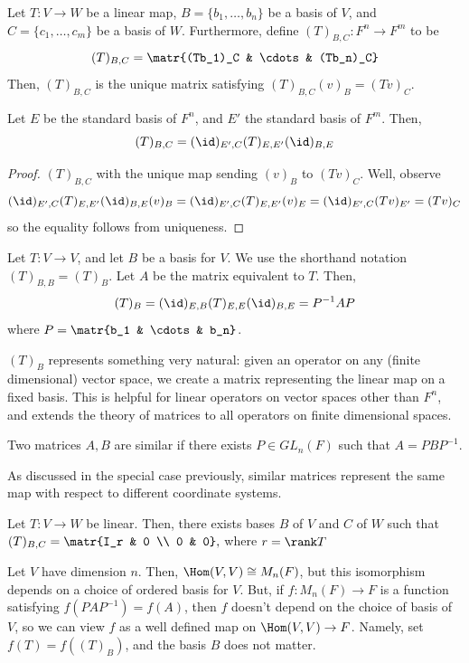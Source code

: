 \begin{defn}
    Let $T:V \to W$ be a linear map, $B=\{b_1,\dots,b_n\}$ be a basis of $V$, and $C=\{c_1,\dots,c_m\}$ be a basis of $W$. Furthermore, define $(T)_{B,C}:F^n\to F^m$  to be
    $$(T)_{B,C}=\matr{(Tb_1)_C & \cdots & (Tb_n)_C}$$
    Then, $(T)_{B,C}$ is the unique matrix satisfying $(T)_{B,C}(v)_B=(Tv)_C$.
\end{defn}

\begin{thm}
    Let $E$ be the standard basis of $F^n$, and $E'$ the standard basis of $F^m$. Then,
    $$(T)_{B,C}=(\id)_{E',C}(T)_{E,E'}(\id)_{B,E}$$
\end{thm}

\begin{proof}
    $(T)_{B,C}$ with the unique map sending $(v)_B$ to $(Tv)_C$. Well, observe
    $$(\id)_{E',C}(T)_{E,E'}(\id)_{B,E} (v)_B=(\id)_{E',C}(T)_{E,E'}(v)_{E}=(\id)_{E',C}(Tv)_{E'}=(Tv)_C$$
    so the equality follows from uniqueness.
\end{proof}

\begin{notebox*}
    Let $T:V \to V$, and let $B$ be a basis for $V$. We use the shorthand notation $(T)_{B,B}=(T)_B$. Let $A$ be the matrix equivalent to $T$. Then,
    $$(T)_B=(\id)_{E,B}(T)_{E,E}(\id)_{B,E}=P^{-1}AP$$
    where $P=\matr{b_1 & \cdots & b_n}$.

    $(T)_B$ represents something very natural: given an operator on any (finite dimensional) vector space, we create a matrix representing the linear map on a fixed basis. This is helpful for linear operators on vector spaces other than $F^n$, and extends the theory of matrices to all operators on finite dimensional spaces.
\end{notebox*}

\begin{defn}
    Two matrices $A,B$ are similar if there exists $P \in GL_n(F)$ such that $A=PBP^{-1}$.
\end{defn}
As discussed in the special case previously, similar matrices represent the same map with respect to different coordinate systems.

\begin{thm}
    Let $T:V \to W$ be linear. Then, there exists bases $B$ of $V$ and $C$ of $W$ such that $(T)_{B,C}=\matr{I_r & 0 \\ 0 & 0},$ where $r = \rank T$
\end{thm}

\begin{rmk}
    Let $V$ have dimension $n$. Then, $\Hom(V,V) \cong M_n(F)$, but this isomorphism depends on a choice of ordered basis for $V$. But, if $f:M_n(F) \to F$ is a function satisfying $f(PAP^{-1})=f(A)$, then $f$ doesn't depend on the choice of basis of $V$, so we can view $f$ as a well defined map on $\Hom(V,V) \to F$. Namely, set $f(T) = f((T)_B)$, and the basis $B$ does not matter.
\end{rmk}

